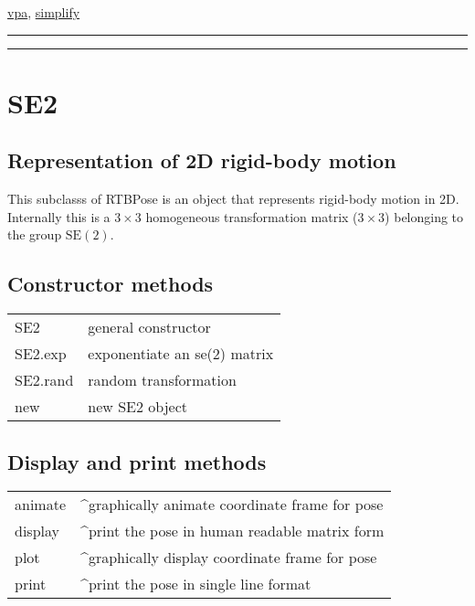 \hyperlink{vpa}{\color{blue} vpa}, \hyperlink{simplify}{\color{blue} simplify}

\vspace{1.5ex}\rule{\textwidth}{1mm}
\vspace{1.5ex}\rule{\textwidth}{1mm}

\hypertarget{SE2}{\section*{SE2}}
\subsection*{Representation of 2D rigid-body motion}


This subclasss of RTBPose is an object that represents rigid-body motion in 2D.
Internally this is a $3 \times 3$ homogeneous transformation matrix ($3 \times 3$) belonging to
the group $\mbox{SE}(2)$.


\subsection*{Constructor methods}
\begin{longtable}{lp{120mm}}
SE2 & general constructor\\ 
SE2.exp & exponentiate an se(2) matrix\\ 
SE2.rand & random transformation\\ 
new & new SE2 object\\ 
\end{longtable}\vspace{1ex}

\subsection*{Display and print methods}
\begin{longtable}{lp{120mm}}
animate & \textasciicircum graphically animate coordinate frame for pose\\ 
display & \textasciicircum print the pose in human readable matrix form\\ 
plot & \textasciicircum graphically display coordinate frame for pose\\ 
print & \textasciicircum print the pose in single line format\\ 
\end{longtable}\vspace{1ex}

